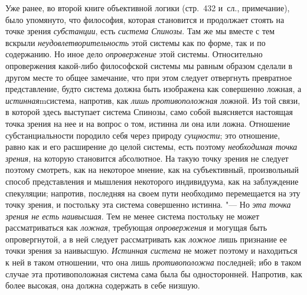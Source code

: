 Уже ранее, во второй книге объективной логики (стр.~432 и~сл., примечание),
было упомянуто, что философия, которая становится и продолжает стоять на
точке зрения {\em субстанции}, есть {\em система Спинозы}. Там же мы вместе
с тем вскрыли {\em неудовлетворительность} этой системы как по форме, так и
по содержанию. Но иное дело {\em опровержение} этой системы. Относительно
опровержения какой-либо философской системы мы равным образом сделали в
другом месте то общее замечание, что при этом следует отвергнуть превратное
представление, будто система должна быть изображена как совершенно ложная,
а {\em истинная}mсистема, напротив, как {\em лишь противоположная} ложной.
Из той связи, в которой здесь выступает система Спинозы, само собой
выясняется настоящая точка зрения на нее и на вопрос о том, истинна ли она
или ложна. Отношение субстанциальности породило себя через природу
{\em сущности}; это отношение, равно как и его расширение до целой системы,
есть поэтому {\em необходимая точка зрения}, на которую становится
абсолютное. На такую точку зрения не следует поэтому смотреть, как на
некоторое мнение, как на субъективный, произвольный способ представления и
мышления некоторого индивидуума, как на заблуждение спекуляции; напротив,
последняя на своем пути необходимо перемещается на эту точку зрения, и
постольку эта система совершенно истинна. "--- Но {\em эта точка зрения не есть
наивысшая}. Тем не менее система постольку не может рассматриваться как
{\em ложная}, требующая {\em опровержения} и могущая быть опровергнутой, а в
ней следует рассматривать как {\em ложное} лишь признание ее точки зрения за
наивысшую. {\em Истинная система} не может поэтому и находиться к ней в
таком отношении, что она лишь {\em противоположна} последней; ибо в таком
случае эта противоположная система сама была бы односторонней. Напротив, как
более высокая, она должна содержать в себе низшую.

